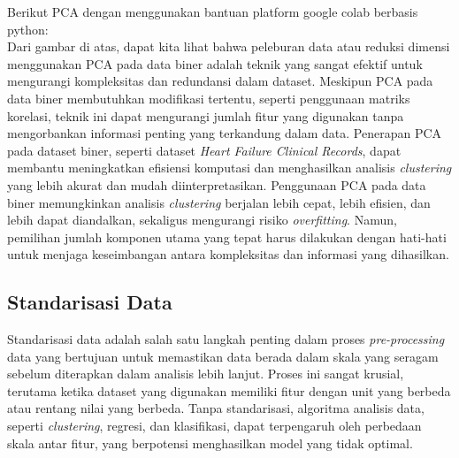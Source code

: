 \documentclass[english,12pt,a4paper,openany]{book}
\begin{document}
	Berikut PCA dengan menggunakan bantuan platform google colab berbasis python:\\
	
	
	Dari gambar di atas, dapat kita lihat bahwa peleburan data atau reduksi dimensi menggunakan PCA pada data biner adalah teknik yang sangat efektif untuk mengurangi kompleksitas dan redundansi dalam dataset. Meskipun PCA pada data biner membutuhkan modifikasi tertentu, seperti penggunaan matriks korelasi, teknik ini dapat mengurangi jumlah fitur yang digunakan tanpa mengorbankan informasi penting yang terkandung dalam data. Penerapan PCA pada dataset biner, seperti dataset \textit{Heart Failure Clinical Records}, dapat membantu meningkatkan efisiensi komputasi dan menghasilkan analisis \textit{clustering} yang lebih akurat dan mudah diinterpretasikan. Penggunaan PCA pada data biner memungkinkan analisis \textit{clustering} berjalan lebih cepat, lebih efisien, dan lebih dapat diandalkan, sekaligus mengurangi risiko \textit{overfitting}. Namun, pemilihan jumlah komponen utama yang tepat harus dilakukan dengan hati-hati untuk menjaga keseimbangan antara kompleksitas dan informasi yang dihasilkan.\\
	
	\subsection{Standarisasi Data}
	Standarisasi data adalah salah satu langkah penting dalam proses \textit{pre-processing} data yang bertujuan untuk memastikan data berada dalam skala yang seragam sebelum diterapkan dalam analisis lebih lanjut. Proses ini sangat krusial, terutama ketika dataset yang digunakan memiliki fitur dengan unit yang berbeda atau rentang nilai yang berbeda. Tanpa standarisasi, algoritma analisis data, seperti \textit{clustering}, regresi, dan klasifikasi, dapat terpengaruh oleh perbedaan skala antar fitur, yang berpotensi menghasilkan model yang tidak optimal.\\
	
\end{document}
